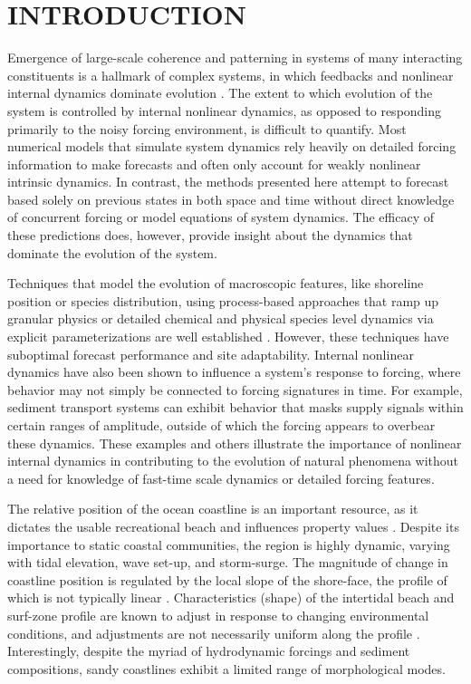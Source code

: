\newpage
{}
\thispagestyle{empty}


\section{INTRODUCTION}
\thispagestyle{empty}


Emergence of large-scale coherence and patterning in systems of many interacting constituents is a hallmark of complex systems, in which feedbacks and nonlinear internal dynamics dominate evolution \cite{emergence}. The extent to which evolution of the system is controlled by internal nonlinear dynamics, as opposed to responding primarily to the noisy forcing environment, is difficult to quantify. Most numerical models that simulate system dynamics rely heavily on detailed forcing information to make forecasts and often only account for weakly nonlinear intrinsic dynamics. In contrast, the methods presented here attempt to forecast based solely on previous states in both space and time without direct knowledge of concurrent forcing or model equations of system dynamics. The efficacy of these predictions does, however, provide insight about the dynamics that dominate the evolution of the system.

Techniques that model the evolution of macroscopic features, like shoreline position or species distribution, using process-based approaches that ramp up granular physics or detailed chemical and physical species level dynamics via explicit parameterizations are well established \cite{beach_model_physics} \cite{coral_model}. However, these techniques have suboptimal forecast performance and site adaptability. Internal nonlinear dynamics have also been shown to influence a system's response to forcing, where behavior may not simply be connected to forcing signatures in time. For example, sediment transport systems can exhibit behavior that masks supply signals within certain ranges of amplitude, outside of which the forcing appears to overbear these dynamics\cite{shredding_signals}. These examples and others illustrate the importance of nonlinear internal dynamics in contributing to the evolution of natural phenomena without a need for knowledge of fast-time scale dynamics or detailed forcing features.

The relative position of the ocean coastline is an important resource, as it dictates the usable recreational beach and influences property values \cite{economic}. Despite its importance to static coastal communities, the region is highly dynamic, varying with tidal elevation, wave set-up, and storm-surge. The magnitude of change in coastline position is regulated by the local slope of the shore-face, the profile of which is not typically linear \cite{beach_profiles}. Characteristics (shape) of the intertidal beach and surf-zone profile are known to adjust in response to changing environmental conditions, and adjustments are not necessarily uniform along the profile \cite{equilibrium_profiles} \cite{equilibrium_profiles2}. Interestingly, despite the myriad of hydrodynamic forcings and sediment compositions, sandy coastlines exhibit a limited range of morphological modes.

